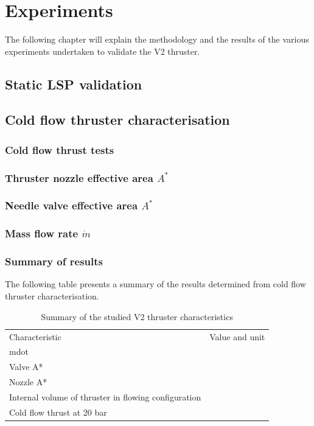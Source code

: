 \chapter{Experiments}

    The following chapter will explain the methodology and the results of the various experiments undertaken to validate the V2 thruster.

    \section{Static LSP validation}


    \section{Cold flow thruster characterisation}

        \subsection{Cold flow thrust tests}

        \subsection{Thruster nozzle effective area $A^*$}

        \subsection{Needle valve effective area $A^*$}

        \subsection{Mass flow rate $\dot m$}

        \subsection{Summary of results}

            The following table presents a summary of the results determined from cold flow thruster characterisation.

            \begin{table}[!ht]
                \caption{Summary of the studied V2 thruster characteristics}
                \label{tab:characteristics}
                \begin{tabularx}{\textwidth}{XX}
                Characteristic             & Value and unit \\
                mdot                       &                \\
                Valve A*                   &                \\
                Nozzle A*                  &                \\
                Internal volume of thruster in flowing configuration        &                \\
                Cold flow thrust at 20 bar &               
                \end{tabularx}
            \end{table}

